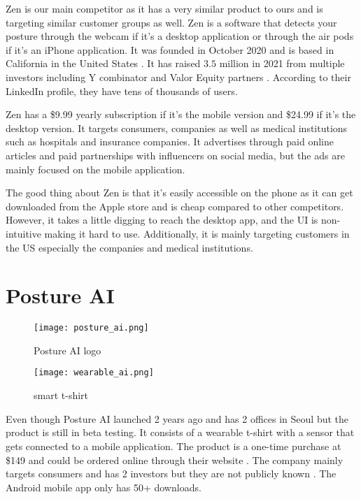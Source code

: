 Zen is our main competitor as it has a very similar product to ours and is targeting similar customer groups as well. Zen is a software that detects your posture through the webcam if it's a desktop application or through the air pods if it's an iPhone application.  It was founded in October 2020 and is based in California in the United States \cite{zen_crunchbase}. It has raised $3.5$ million in 2021 from multiple investors including Y combinator\cite{posturehealth_ycombinator} and Valor Equity partners \cite{zen_techcrunch}. According to their LinkedIn\cite{posturehealth_linkedin} profile, they have tens of thousands of users. 

\p
Zen has a \$9.99 yearly subscription if it's the mobile version and \$24.99 if it's the desktop version. It targets consumers, companies as well as medical institutions such as hospitals and insurance companies. It advertises through paid online articles and paid partnerships with influencers on social media, but the ads are mainly focused on the mobile application.

\p
The good thing about Zen is that it's easily accessible on the phone as it can get downloaded from the Apple store and is cheap compared to other competitors. However, it takes a little digging to reach the desktop app, and the UI is non-intuitive making it hard to use. Additionally, it is mainly targeting customers in the US especially the companies and medical institutions.

\section{Posture AI}
\begin{figure}[H]
    \centering
    \texttt{[image: posture\_ai.png]}
    \caption{Posture AI logo}
    \label{fig:posture_ai}
\end{figure}

\begin{figure}[H]
    \centering
    \texttt{[image: wearable\_ai.png]}
    \caption{smart t-shirt}
    \label{fig:wearable_ai}
\end{figure}
Even though Posture AI launched 2 years ago and has 2 offices in Seoul \cite{postureai_linkedin} but the product is still in beta testing. It consists of a wearable t-shirt with a sensor that gets connected to a mobile application. The product is a one-time purchase at \$149 and could be ordered online through their website \cite{myposture}. The company mainly targets consumers and has 2 investors but they are not publicly known \cite{postureai_pitchbook}. The Android mobile app only has 50+ downloads. 

